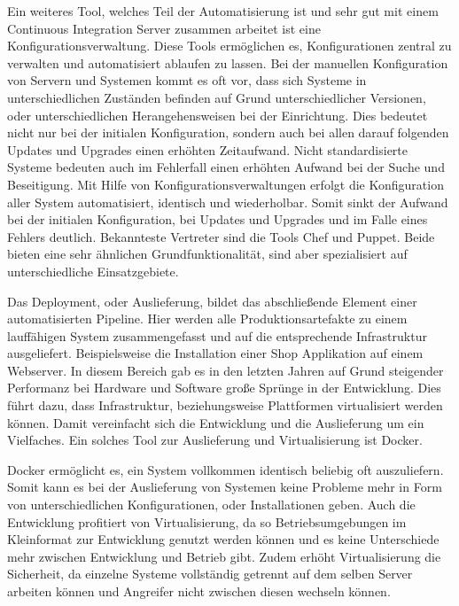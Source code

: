 Ein weiteres Tool, welches Teil der Automatisierung ist und sehr gut mit einem Continuous Integration Server zusammen arbeitet ist eine Konfigurationsverwaltung. 
Diese Tools ermöglichen es, Konfigurationen zentral zu verwalten und automatisiert ablaufen zu lassen. 
Bei der manuellen Konfiguration von Servern und Systemen kommt es oft vor, dass sich Systeme in unterschiedlichen Zuständen befinden auf Grund unterschiedlicher Versionen, oder unterschiedlichen Herangehensweisen bei der Einrichtung. 
Dies bedeutet nicht nur bei der initialen Konfiguration, sondern auch bei allen darauf folgenden Updates und Upgrades einen erhöhten Zeitaufwand. 
Nicht standardisierte Systeme bedeuten auch im Fehlerfall einen erhöhten Aufwand bei der Suche und Beseitigung. 
Mit Hilfe von Konfigurationsverwaltungen erfolgt die Konfiguration aller System automatisiert, identisch und wiederholbar. 
Somit sinkt der Aufwand bei der initialen Konfiguration, bei Updates und Upgrades und im Falle eines Fehlers deutlich. 
Bekannteste Vertreter sind die Tools Chef und Puppet. 
Beide bieten eine sehr ähnlichen Grundfunktionalität, sind aber spezialisiert auf unterschiedliche Einsatzgebiete. 
\parencite[Vgl.][S. 1 ff., S. 8 ff.]{krum:2014, taylor:2014}


Das Deployment, oder Auslieferung, bildet das abschließende Element einer automatisierten Pipeline. 
Hier werden alle Produktionsartefakte zu einem lauffähigen System zusammengefasst und auf die entsprechende Infrastruktur ausgeliefert.
Beispielsweise die Installation einer Shop Applikation auf einem Webserver. 
In diesem Bereich gab es in den letzten Jahren auf Grund steigender Performanz bei Hardware und Software große Sprünge in der Entwicklung. 
Dies führt dazu, dass Infrastruktur, beziehungsweise Plattformen virtualisiert werden können. 
Damit vereinfacht sich die Entwicklung und die Auslieferung um ein Vielfaches. Ein solches Tool zur Auslieferung und Virtualisierung ist Docker.

Docker ermöglicht es, ein System vollkommen identisch beliebig oft auszuliefern. 
Somit kann es bei der Auslieferung von Systemen keine Probleme mehr in Form von unterschiedlichen Konfigurationen, oder Installationen geben. 
Auch die Entwicklung profitiert von Virtualisierung, da so Betriebsumgebungen im Kleinformat zur Entwicklung genutzt werden können und es keine Unterschiede mehr zwischen Entwicklung und Betrieb gibt.
Zudem erhöht Virtualisierung die Sicherheit, da einzelne Systeme vollständig getrennt auf dem selben Server arbeiten können und Angreifer nicht zwischen diesen wechseln können. 
\parencite[Vgl.][S. 3 ff.]{matthias:2015}

